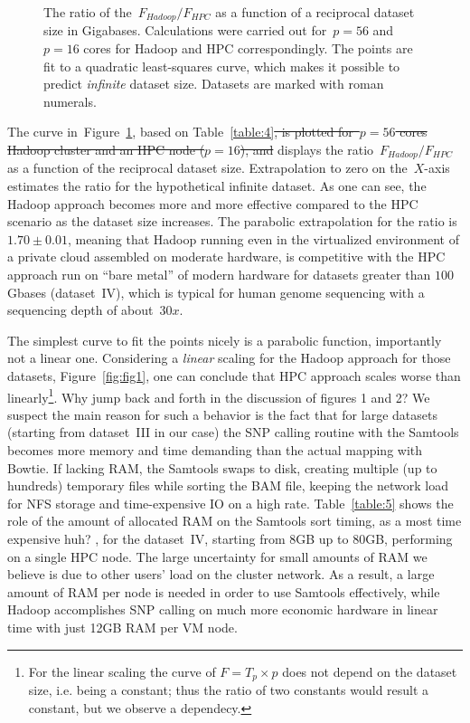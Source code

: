 \documentclass[11pt, oneside]{article}   	%
\newcommand{\COMMENT}[1]{{\color{red} #1 }}
\begin{document}
\begin{figure}
	
	\caption{The ratio of the~$F_{Hadoop}/F_{HPC}$ as a function of a reciprocal dataset size in Gigabases. Calculations were carried out for~$p=56$ and $p=16$ cores for Hadoop and HPC correspondingly.
The points are fit to a quadratic least-squares curve, which makes it possible to predict {\it infinite} dataset size. Datasets are marked with roman numerals.}
	\label{fig:fig2}
\end{figure}

The curve  in~Figure~\ref{fig:fig2}, based on Table~\ref{table:4}\sout{, is plotted for~$p=56$ cores Hadoop cluster and an HPC node ($p=16$), and} displays the ratio~$F_{Hadoop}/F_{HPC}$ as a function of the reciprocal dataset size. Extrapolation to zero on the~$X$-axis estimates the ratio for the hypothetical infinite dataset. As one can see, the Hadoop approach becomes more and more effective compared to the HPC scenario as the dataset size increases. 
The parabolic extrapolation for the ratio is $1.70\pm0.01$, meaning that Hadoop running even in the virtualized environment of a private cloud assembled on moderate hardware, is competitive with the HPC approach run on ``bare metal'' of modern hardware for datasets greater than $100$\,Gbases (dataset~IV), which is typical for human genome sequencing with a sequencing depth of about~$30x$.

The simplest curve to fit the points nicely is a parabolic function, importantly not a linear one. Considering a {\it linear} scaling for the Hadoop approach for those datasets, Figure~\ref{fig:fig1}, one can conclude that HPC approach scales worse than linearly\footnote{For the linear scaling the curve of $F=T_{p}\times p$ does not depend on the dataset size, i.e. being a constant; thus the ratio of two constants would result a constant, but we observe a dependecy.}. \COMMENT{Why jump back and forth in the discussion of figures 1 and 2?} We suspect the main reason for such a behavior is the fact that for large datasets (starting from dataset~III in our case) the SNP calling routine with the Samtools becomes more memory and time demanding than the actual mapping with Bowtie.
If lacking  RAM, the Samtools swaps to disk, creating multiple (up to hundreds) temporary files while sorting the BAM file, keeping the network load for NFS storage and time-expensive IO on a high rate.
Table~\ref{table:5} shows the role of the amount of allocated RAM on the Samtools sort timing, as a most time expensive \COMMENT{huh?}, for the dataset~IV, starting from 8GB up to 80GB, performing on a single HPC node. The large uncertainty for small amounts of RAM we believe is due to other users' load on the cluster network. As a result, a large amount of RAM per node is needed in order to use Samtools effectively, while Hadoop accomplishes SNP calling on much more economic hardware in linear time with just 12GB RAM per VM node.
\end{document}
